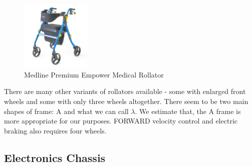 \begin{figure}[H]
	\centering
	\includegraphics[width=0.3\textwidth]{./Images/rollator-amaz.jpg}
	\caption{\label{fig:rollator-amaz}Medline Premium Empower Medical Rollator}
\end{figure}

\noindent There are many other variants of rollators available - some with enlarged front wheels and some with only three wheels altogether. There seem to be two main shapes of frame: A and what we can call $\lambda$. We estimate that, the A frame is more appropriate for our purposes. FORWARD velocity control and electric braking also requires four wheels.\\


\subsection{Electronics Chassis} \label{chassis}
